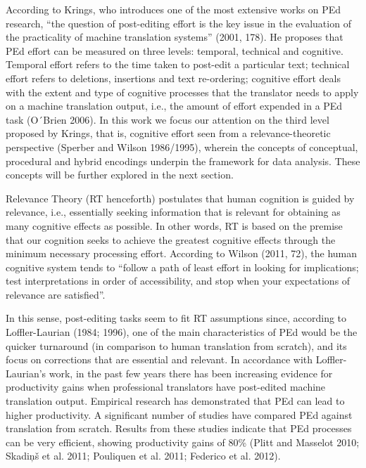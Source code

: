 \documentclass[output=paper]{langsci/langscibook}
\begin{document}
According to Krings, who introduces one of the most extensive works on PEd research, “the question of post-editing effort is the key issue in the evaluation of the practicality of machine translation systems” (2001, 178). He proposes that PEd effort can be measured on three levels: temporal, technical and cognitive. Temporal effort refers to the time taken to post-edit a particular text; technical effort refers to deletions, insertions and text re-ordering; cognitive effort deals with the extent and type of cognitive processes that the translator needs to apply on a machine translation output, i.e., the amount of effort expended in a PEd task (O´Brien 2006). In this work we focus our attention on the third level proposed by Krings, that is, cognitive effort seen from a relevance-theoretic perspective (Sperber and Wilson 1986/1995), wherein the concepts of conceptual, procedural and hybrid encodings underpin the framework for data analysis. These concepts will be further explored in the next section.



Relevance Theory (RT henceforth) postulates that human cognition is guided by relevance, i.e., essentially seeking information that is relevant for obtaining as many cognitive effects as possible. In other words, RT is based on the premise that our cognition seeks to achieve the greatest cognitive effects through the minimum necessary processing effort. According to Wilson (2011, 72), the human cognitive system tends to “follow a path of least effort in looking for implications; test interpretations in order of accessibility, and stop when your expectations of relevance are satisfied”. 



In this sense, post-editing tasks seem to fit RT assumptions since, according to Loffler-Laurian (1984; 1996), one of the main characteristics of PEd would be the quicker turnaround (in comparison to human translation from scratch), and its focus on corrections that are essential and relevant. In accordance with Loffler-Laurian’s work, in the past few years there has been increasing evidence for productivity gains when professional translators have post-edited machine translation output. Empirical research has demonstrated that PEd can lead to higher productivity. A significant number of studies have compared PEd against translation from scratch. Results from these studies indicate that PEd processes can be very efficient, showing productivity gains of 80\% (Plitt and Masselot 2010; Skadi\c{n}š et al. 2011; Pouliquen et al. 2011; Federico et al. 2012). 
\end{document}
